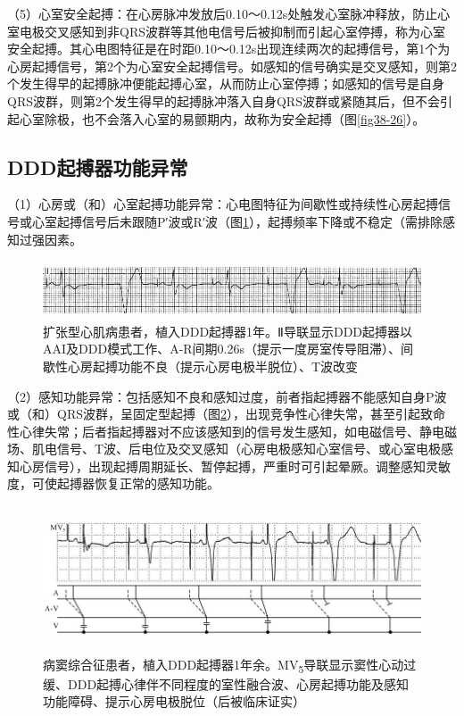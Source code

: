 （5）心室安全起搏：在心房脉冲发放后0.10～0.12s处触发心室脉冲释放，防止心室电极交叉感知到非QRS波群等其他电信号后被抑制而引起心室停搏，称为心室安全起搏。其心电图特征是在时距0.10～0.12s出现连续两次的起搏信号，第1个为心房起搏信号，第2个为心室安全起搏信号。如感知的信号确实是交叉感知，则第2个发生得早的起搏脉冲便能起搏心室，从而防止心室停搏；如感知的信号是自身QRS波群，则第2个发生得早的起搏脉冲落入自身QRS波群或紧随其后，但不会引起心室除极，也不会落入心室的易颤期内，故称为安全起搏（图\ref{fig38-26}）。

\protect\hypertarget{text00045.htmlux5cux23subid498}{}{}

\subsection{DDD起搏器功能异常}

（1）心房或（和）心室起搏功能异常：心电图特征为间歇性或持续性心房起搏信号或心室起搏信号后未跟随P′波或R′波（图\ref{fig38-33}），起搏频率下降或不稳定（需排除感知过强因素。

\begin{figure}[!htbp]
 \centering
 \includegraphics[width=5.58333in,height=0.67708in]{./images/Image00636.jpg}
 \captionsetup{justification=centering}
 \caption{扩张型心肌病患者，植入DDD起搏器1年。Ⅱ导联显示DDD起搏器以AAI及DDD模式工作、A-R间期0.26s（提示一度房室传导阻滞）、间歇性心房起搏功能不良（提示心房电极半脱位）、T波改变}
 \label{fig38-33}
  \end{figure} 

（2）感知功能异常：包括感知不良和感知过度，前者指起搏器不能感知自身P波或（和）QRS波群，呈固定型起搏（图\ref{fig38-34}），出现竞争性心律失常，甚至引起致命性心律失常；后者指起搏器对不应该感知到的信号发生感知，如电磁信号、静电磁场、肌电信号、T波、后电位及交叉感知（心房电极感知心室信号、或心室电极感知心房信号），出现起搏周期延长、暂停起搏，严重时可引起晕厥。调整感知灵敏度，可使起搏器恢复正常的感知功能。

\begin{figure}[!htbp]
 \centering
 \includegraphics[width=5.80208in,height=1.70833in]{./images/Image00637.jpg}
 \captionsetup{justification=centering}
 \caption{病窦综合征患者，植入DDD起搏器1年余。MV\textsubscript{5}导联显示窦性心动过缓、DDD起搏心律伴不同程度的室性融合波、心房起搏功能及感知功能障碍、提示心房电极脱位（后被临床证实）}
 \label{fig38-34}
  \end{figure} 


